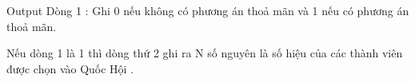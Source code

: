 Output
Dòng 1 : Ghi 0 nếu không có phương án thoả mãn và 1 nếu có phương án thoả mãn.   


   Nếu dòng 1 là 1 thì dòng thứ 2 ghi ra N số nguyên là số hiệu của các thành viên được chọn vào Quốc Hội .